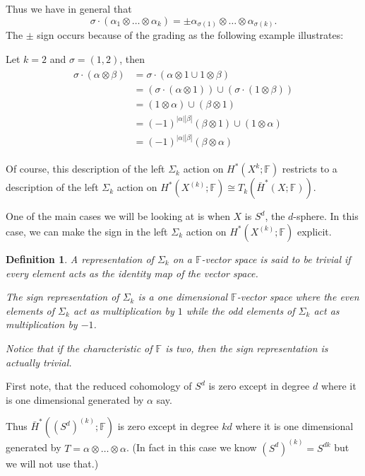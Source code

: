 \documentclass{amsart}
\newtheorem{defn}[thm]{Definition}
\newcommand{\FF}{\mathbb{F}}
\begin{document}
Thus we have in general that 
$$
\sigma \cdot (\alpha_1 \otimes \dots \otimes \alpha_k) 
= \pm \alpha_{\sigma(1)} \otimes \dots \otimes \alpha_{\sigma(k)}.
$$ 
The $\pm$ sign occurs because of the grading as the following 
example illustrates:

Let $k=2$ and $\sigma=(1,2)$, then 
\begin{align*}
\begin{split}
\sigma \cdot (\alpha \otimes \beta) &= \sigma \cdot (\alpha \otimes 1 \cup 
1 \otimes \beta) \\
&= (\sigma \cdot ( \alpha \otimes 1)) \cup (\sigma \cdot (1 \otimes \beta)) \\
&= (1 \otimes \alpha) \cup (\beta \otimes 1) \\
&= (-1)^{|\alpha||\beta|}(\beta \otimes 1 ) \cup (1 \otimes \alpha) \\
&= (-1)^{|\alpha||\beta|}(\beta \otimes \alpha) 
\end{split}
\end{align*}

Of course, this description of the left $\Sigma_k$ action on 
$H^*(X^k; \FF)$ restricts to a description of the left 
$\Sigma_k$ action on  
$H^*(X^{(k)}; \FF) \cong T_k(\bar{H}^*(X; \FF))$. 

One of the main cases we will be looking at is when $X$ is $S^d$, the 
$d$-sphere. In this case, we can make the sign in the left $\Sigma_k$ 
action on $H^*(X^{(k)}; \FF)$ explicit. 

\begin{defn}
A representation of $\Sigma_k$ on a $\FF$-vector space is said to 
be trivial if every element acts as the identity map of the vector 
space.

The sign representation of $\Sigma_k$ is a one dimensional 
$\FF$-vector space where the even elements of $\Sigma_k$ act as 
multiplication by $1$ while the odd elements of $\Sigma_k$ act 
as multiplication by $-1$. 

Notice that if the characteristic of $\FF$ is two, then the 
sign representation is actually trivial.
\end{defn}

First note, that the reduced 
cohomology of $S^d$ is zero except in degree $d$ where it is 
one dimensional generated by $\alpha$ say. 

Thus 
$\bar{H}^*((S^d)^{(k)}; \FF)$ is zero except in degree $kd$ 
where it is one dimensional generated by $T=\alpha \otimes \dots \otimes 
\alpha$. (In fact in this case we know $(S^d)^{(k)}=S^{dk}$ but we will not 
use that.)
\end{document}
